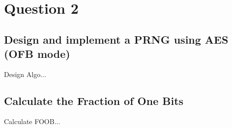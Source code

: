 \documentclass[10pt]{article}
\begin{document}
\vspace{0.2in}
\section{Question 2}
\subsection{Design and implement a PRNG using AES (OFB mode)}
\noindent Design Algo...


\subsection{Calculate the Fraction of One Bits} 
\noindent Calculate FOOB...

\vspace{0.2in}
\end{document}
